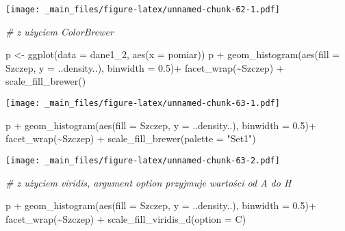 \documentclass[
]{book}
\newenvironment{Shaded}{\begin{snugshade}}{\end{snugshade}}
\newcommand{\AttributeTok}[1]{\textcolor[rgb]{0.77,0.63,0.00}{#1}}
\newcommand{\CommentTok}[1]{\textcolor[rgb]{0.56,0.35,0.01}{\textit{#1}}}
\newcommand{\FloatTok}[1]{\textcolor[rgb]{0.00,0.00,0.81}{#1}}
\newcommand{\FunctionTok}[1]{\textcolor[rgb]{0.00,0.00,0.00}{#1}}
\newcommand{\NormalTok}[1]{#1}
\newcommand{\OtherTok}[1]{\textcolor[rgb]{0.56,0.35,0.01}{#1}}
\newcommand{\SpecialCharTok}[1]{\textcolor[rgb]{0.00,0.00,0.00}{#1}}
\newcommand{\StringTok}[1]{\textcolor[rgb]{0.31,0.60,0.02}{#1}}
\begin{document}
\texttt{[image: \_main\_files/figure-latex/unnamed-chunk-62-1.pdf]}

\begin{Shaded}
\begin{Highlighting}[]
\CommentTok{\# z użyciem ColorBrewer}

\NormalTok{p }\OtherTok{\textless{}{-}} \FunctionTok{ggplot}\NormalTok{(}\AttributeTok{data =}\NormalTok{ dane1\_2, }\FunctionTok{aes}\NormalTok{(}\AttributeTok{x =}\NormalTok{ pomiar))}
\NormalTok{p }\SpecialCharTok{+} \FunctionTok{geom\_histogram}\NormalTok{(}\FunctionTok{aes}\NormalTok{(}\AttributeTok{fill =}\NormalTok{ Szczep, }\AttributeTok{y =}\NormalTok{ ..density..), }\AttributeTok{binwidth =} \FloatTok{0.5}\NormalTok{)}\SpecialCharTok{+}
  \FunctionTok{facet\_wrap}\NormalTok{(}\SpecialCharTok{\textasciitilde{}}\NormalTok{Szczep) }\SpecialCharTok{+} \FunctionTok{scale\_fill\_brewer}\NormalTok{()}
\end{Highlighting}
\end{Shaded}

\texttt{[image: \_main\_files/figure-latex/unnamed-chunk-63-1.pdf]}

\begin{Shaded}
\begin{Highlighting}[]
\NormalTok{p }\SpecialCharTok{+} \FunctionTok{geom\_histogram}\NormalTok{(}\FunctionTok{aes}\NormalTok{(}\AttributeTok{fill =}\NormalTok{ Szczep, }\AttributeTok{y =}\NormalTok{ ..density..), }\AttributeTok{binwidth =} \FloatTok{0.5}\NormalTok{)}\SpecialCharTok{+}
  \FunctionTok{facet\_wrap}\NormalTok{(}\SpecialCharTok{\textasciitilde{}}\NormalTok{Szczep) }\SpecialCharTok{+} \FunctionTok{scale\_fill\_brewer}\NormalTok{(}\AttributeTok{palette =} \StringTok{"Set1"}\NormalTok{)}
\end{Highlighting}
\end{Shaded}

\texttt{[image: \_main\_files/figure-latex/unnamed-chunk-63-2.pdf]}

\begin{Shaded}
\begin{Highlighting}[]
\CommentTok{\# z użyciem viridis, argument option przyjmuje wartości od A do H}

\NormalTok{p }\SpecialCharTok{+} \FunctionTok{geom\_histogram}\NormalTok{(}\FunctionTok{aes}\NormalTok{(}\AttributeTok{fill =}\NormalTok{ Szczep, }\AttributeTok{y =}\NormalTok{ ..density..), }\AttributeTok{binwidth =} \FloatTok{0.5}\NormalTok{)}\SpecialCharTok{+}
  \FunctionTok{facet\_wrap}\NormalTok{(}\SpecialCharTok{\textasciitilde{}}\NormalTok{Szczep) }\SpecialCharTok{+} \FunctionTok{scale\_fill\_viridis\_d}\NormalTok{(}\AttributeTok{option =} \StringTok{\textquotesingle{}C\textquotesingle{}}\NormalTok{)}
\end{Highlighting}
\end{Shaded}
\end{document}
